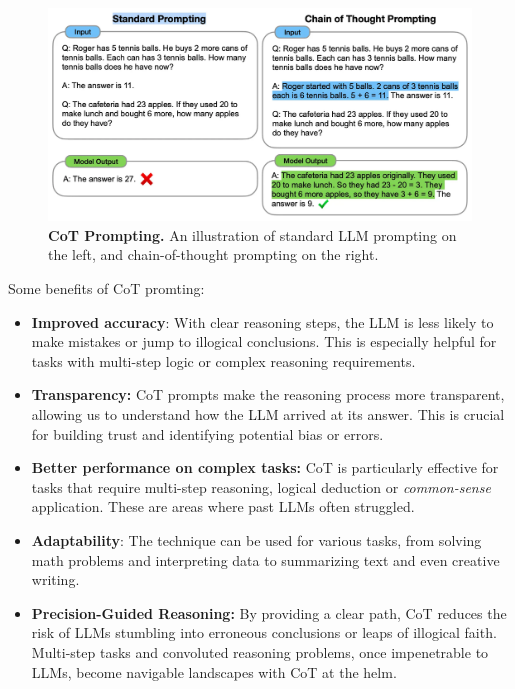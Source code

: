 \documentclass[fleqn,moreauthors,10pt]{ds_report}
\begin{document}
    \begin{figure}[ht]\centering
    	\includegraphics[width=\linewidth]{cot.png}
    	\caption{\textbf{CoT Prompting.} An illustration of standard LLM prompting on the left, and chain-of-thought prompting on the right.}
    	\label{fig:column}
    \end{figure}
\bigskip
\bigskip
\bigskip
\bigskip
\bigskip\bigskip
\bigskip\bigskip
\bigskip\bigskip
\bigskip
Some benefits of CoT promting:
\begin{itemize}
    \item \textbf{Improved accuracy}: With clear reasoning steps, the LLM is less likely to make mistakes or jump to illogical conclusions. This is especially helpful for tasks with multi-step logic or complex reasoning requirements.
    \item \textbf{Transparency:} CoT prompts make the reasoning process more transparent, allowing us to understand how the LLM arrived at its answer. This is crucial for building trust and identifying potential bias or errors.
    \item \textbf{Better performance on complex tasks:} CoT is particularly effective for tasks that require multi-step reasoning, logical deduction or \textit{common-sense} application. These are areas where past LLMs often struggled.
    \item \textbf{Adaptability}: The technique can be used for various tasks, from solving math problems and interpreting data to summarizing text and even creative writing.
    \item \textbf{Precision-Guided Reasoning:} By providing a clear path, CoT reduces the risk of LLMs stumbling into erroneous conclusions or leaps of illogical faith. Multi-step tasks and convoluted reasoning problems, once impenetrable to LLMs, become navigable landscapes with CoT at the helm. \cite{cot} 

\end{itemize}
\end{document}
